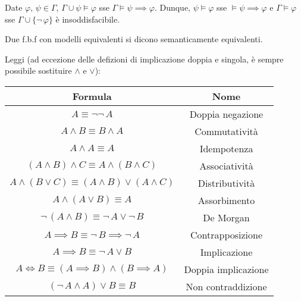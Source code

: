 \documentclass[10pt]{article}
\begin{document}
        Date \(\varphi, \, \psi \in \Gamma\), \(\Gamma \cup {\psi} \models \varphi\) sse \(\Gamma \models \psi \implies \varphi\).
        Dunque, \(\psi \models \varphi\) sse \(\models \psi \implies \varphi\) e \(\Gamma \models \varphi\) sse
        \(\Gamma \cup \{\neg \, \varphi\}\) è insoddisfacibile.

        Due f.b.f con modelli equivalenti si dicono semanticamente equivalenti.

        Leggi (ad eccezione delle defizioni di implicazione doppia e singola, è sempre possibile sostituire \(\land\) e \(\lor\)):
        \begin{table}[h]
            \centering

            \begin{tabular}{|| c | c ||}
                \hline
                Formula & Nome\\
                \hline\hline
                \(A \equiv \neg\neg \, A\) & Doppia negazione\\
                \hline
                \(A \land B \equiv B \land A\) & Commutatività\\
                \hline
                \(A \land A \equiv A\) & Idempotenza\\
                \hline
                \((A \land B) \land C \equiv A \land (B \land C)\) & Associatività\\
                \hline
                \(A \land (B \lor C) \equiv (A \land B) \lor (A \land C)\) & Distributività\\
                \hline
                \(A \land (A \lor B) \equiv A\) & Assorbimento\\
                \hline
                \(\neg \, (A \land B) \equiv \neg \, A \lor \neg \, B\) & De Morgan\\
                \hline
                \(A \implies B \equiv \neg \, B \implies \neg \, A\) & Contrapposizione\\
                \hline
                \(A \implies B \equiv \neg \, A \lor B\) & Implicazione\\
                \hline
                \(A \iff B \equiv (A \implies B) \land (B \implies A)\) & Doppia implicazione\\
                \hline
                \((\neg \, A \land A) \lor B \equiv B\) & Non contraddizione\\
                \hline
            \end{tabular}
        \end{table}
\end{document}
